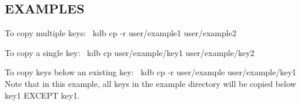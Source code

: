 \subsection*{E\+X\+A\+M\+P\+L\+ES}

To copy multiple keys\+:~\newline
 {\ttfamily kdb cp -\/r user/example1 user/example2}

To copy a single key\+:~\newline
 {\ttfamily kdb cp user/example/key1 user/example/key2}

To copy keys below an existing key\+:~\newline
 {\ttfamily kdb cp -\/r user/example user/example/key1}~\newline
 Note that in this example, all keys in the example directory will be copied below {\ttfamily key1} E\+X\+C\+E\+PT {\ttfamily key1}. 